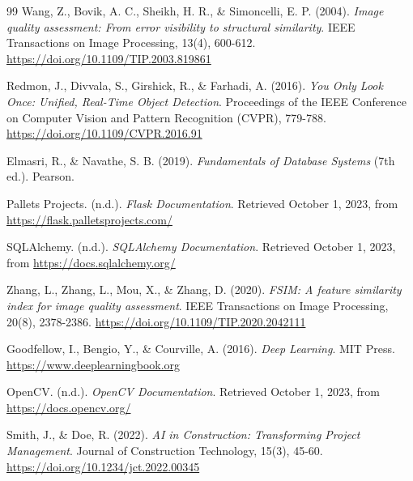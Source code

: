 \begin{thebibliography}{99}
    Wang, Z., Bovik, A. C., Sheikh, H. R., \& Simoncelli, E. P. (2004). 
    \textit{Image quality assessment: From error visibility to structural similarity}. 
    IEEE Transactions on Image Processing, 13(4), 600-612. 
    \href{https://doi.org/10.1109/TIP.2003.819861}{https://doi.org/10.1109/TIP.2003.819861}
    
    Redmon, J., Divvala, S., Girshick, R., \& Farhadi, A. (2016). 
    \textit{You Only Look Once: Unified, Real-Time Object Detection}. 
    Proceedings of the IEEE Conference on Computer Vision and Pattern Recognition (CVPR), 779-788. 
    \href{https://doi.org/10.1109/CVPR.2016.91}{https://doi.org/10.1109/CVPR.2016.91}
    
    Elmasri, R., \& Navathe, S. B. (2019). 
    \textit{Fundamentals of Database Systems} (7th ed.). 
    Pearson.

    Pallets Projects. (n.d.). 
    \textit{Flask Documentation}. 
    Retrieved October 1, 2023, from \url{https://flask.palletsprojects.com/}
    
    SQLAlchemy. (n.d.). 
    \textit{SQLAlchemy Documentation}. 
    Retrieved October 1, 2023, from \url{https://docs.sqlalchemy.org/}

    Zhang, L., Zhang, L., Mou, X., \& Zhang, D. (2020). 
    \textit{FSIM: A feature similarity index for image quality assessment}. 
    IEEE Transactions on Image Processing, 20(8), 2378-2386. 
    \href{https://doi.org/10.1109/TIP.2020.2042111}{https://doi.org/10.1109/TIP.2020.2042111}

    Goodfellow, I., Bengio, Y., \& Courville, A. (2016). 
    \textit{Deep Learning}. 
    MIT Press. 
    \href{https://www.deeplearningbook.org}{https://www.deeplearningbook.org}

    OpenCV. (n.d.). 
    \textit{OpenCV Documentation}. 
    Retrieved October 1, 2023, from \url{https://docs.opencv.org/}

    Smith, J., \& Doe, R. (2022). 
    \textit{AI in Construction: Transforming Project Management}. 
    Journal of Construction Technology, 15(3), 45-60. 
    \href{https://doi.org/10.1234/jct.2022.00345}{https://doi.org/10.1234/jct.2022.00345}
\end{thebibliography}